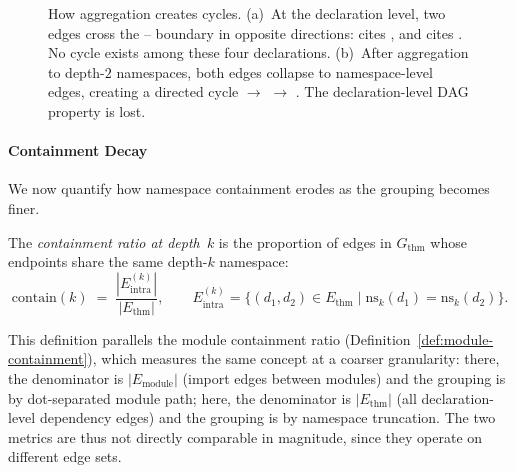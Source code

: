 \begin{figure}[ht]
\caption{How aggregation creates cycles. (a)~At the declaration level, two edges cross the -- boundary in opposite directions:  cites , and  cites . No cycle exists among these four declarations. (b)~After aggregation to depth-$2$ namespaces, both edges collapse to namespace-level edges, creating a directed cycle  $\to$  $\to$ . The declaration-level DAG property is lost.}
\label{fig:ns-cycle-example}
\end{figure}

\paragraph{Containment Decay}
\label{sec:containment-decay}

We now quantify how namespace containment erodes as the grouping becomes finer.

\begin{definition}
\label{def:containment}
The \emph{containment ratio at depth~$k$} is the proportion of edges in $G_{\mathrm{thm}}$ whose endpoints share the same depth-$k$ namespace:
\[
  \mathrm{contain}(k) \;=\; \frac{|E_{\mathrm{intra}}^{(k)}|}{|E_{\mathrm{thm}}|},
  \qquad
  E_{\mathrm{intra}}^{(k)} = \{(d_1,d_2) \in E_{\mathrm{thm}} \mid \mathrm{ns}_k(d_1) = \mathrm{ns}_k(d_2)\}.
\]
\end{definition}

\noindent
This definition parallels the module containment ratio (Definition~\ref{def:module-containment}), which measures the same concept at a coarser granularity: there, the denominator is $|E_{\mathrm{module}}|$ (import edges between modules) and the grouping is by dot-separated module path; here, the denominator is $|E_{\mathrm{thm}}|$ (all declaration-level dependency edges) and the grouping is by namespace truncation. The two metrics are thus not directly comparable in magnitude, since they operate on different edge sets.

